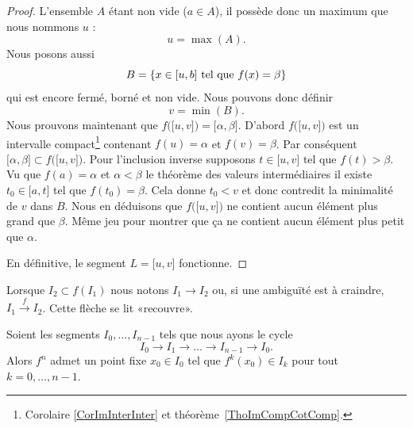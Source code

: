 \begin{proof}
    L'ensemble \( A\) étant non vide (\( a\in A\)), il possède donc un maximum que nous nommons \( u\) :
    \begin{equation}
        u=\max(A).
    \end{equation}
    Nous posons aussi
    \begin{equation}
        B=\{ x\in \mathopen[ u , b \mathclose]\text{ tel que } f(x)=\beta \}
    \end{equation}
    qui est encore fermé, borné et non vide. Nous pouvons donc définir
    \begin{equation}
        v=\min(B).
    \end{equation}
    Nous prouvons maintenant que \( f\big( \mathopen[ u , v \mathclose] \big)=\mathopen[ \alpha , \beta \mathclose]\). D'abord \( f\big( \mathopen[ u , v \mathclose] \big)\) est un intervalle compact\footnote{Corolaire \ref{CorImInterInter} et théorème~\ref{ThoImCompCotComp}.} contenant \( f(u)=\alpha\) et \( f(v)=\beta\). Par conséquent \( \mathopen[ \alpha , \beta \mathclose]\subset f\big( \mathopen[ u , v \mathclose] \big)\). Pour l'inclusion inverse supposons \( t\in \mathopen[ u , v \mathclose]\) tel que \( f(t)>\beta\). Vu que \( f(a)=\alpha\) et \( \alpha<\beta\) le théorème des valeurs intermédiaires il existe \( t_0\in \mathopen[ a , t \mathclose]\) tel que \( f(t_0)=\beta\). Cela donne \( t_0<v\) et donc contredit la minimalité de \( v\) dans \( B\). Nous en déduisons que \( f\big( \mathopen[ u , v \mathclose] \big)\) ne contient aucun élément plus grand que \( \beta\). Même jeu pour montrer que ça ne contient aucun élément plus petit que \( \alpha\).

    En définitive, le segment \( L=\mathopen[ u , v \mathclose]\) fonctionne.
\end{proof}

Lorsque \( I_2\subset f(I_1)\) nous notons \( I_1\to I_2\) ou, si une ambiguïté est à craindre, \( I_1\stackrel{f}{\longrightarrow}I_2\). Cette flèche se lit «recouvre».
\begin{lemma}      \label{LemSSPXooMkwzjb}
    Soient les segments \( I_0,\ldots, I_{n-1}\) tels que nous ayons le cycle
    \begin{equation}
        I_0\to I_1\to\ldots\to I_{n-1}\to I_0.
    \end{equation}
    Alors \( f^n\) admet un point fixe \( x_0\in I_0\) tel que \( f^k(x_0)\in I_k\) pour tout \( k=0,\ldots, n-1\).
\end{lemma}

